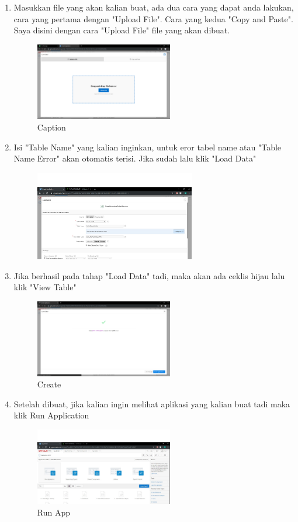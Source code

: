 \documentclass{article}
\begin{document}
\begin{enumerate}
    \item Masukkan file yang akan kalian buat, ada dua cara yang dapat anda lakukan, cara yang pertama dengan "Upload File". Cara yang kedua "Copy and Paste". Saya disini dengan cara "Upload File" file yang akan dibuat.
     \begin{figure}[!htbp]
        \centering
        \includegraphics [width=6cm]{Figure/CF.png}
        \caption{Caption}
        \label{capture3}
    \end{figure}
    
    \item Isi "Table Name" yang kalian inginkan, untuk eror tabel name atau "Table Name Error" akan otomatis terisi. Jika sudah lalu klik "Load Data"
    \begin{figure}[h]
	\centering
	\includegraphics[width=7cm]{Figure/ID.jpg}
	\caption{}
	\label{fig:gambar}
	\end{figure}
	
    \item Jika berhasil pada tahap "Load Data" tadi, maka akan ada ceklis hijau lalu klik "View Table"
    \begin{figure}[h]
	\centering
	\includegraphics[width=6cm]{Figure/CA.png}
	\caption{Create}
	\label{fig:gambar}
	\end{figure}
	
	    \item Setelah dibuat, jika kalian ingin melihat aplikasi yang kalian buat tadi maka klik Run Application
    \begin{figure}[h]
	\centering
	\includegraphics[width=6cm]{Figure/RA.jpg}
	\caption{Run App}
	\label{fig:gambar}
	\end{figure}
    

\end{enumerate}
\end{document}
